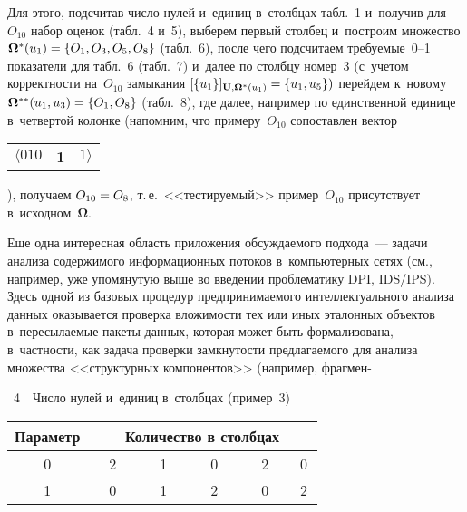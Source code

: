 \begin{multicols}{2}
Для этого, подсчитав число нулей и~единиц в~столбцах табл.~1 и~получив 
для~$O_{10}$ набор оценок (табл.~4 и~5), выберем первый столбец 
и~построим множество ${\boldsymbol{\Omega}}^*(u_1)\hm= \{O_1, O_3, O_5, O_8\}$ 
(табл.~6), после чего подсчитаем требуемые~0--1 показатели для табл.~6 
(табл.~7) и~далее по столбцу номер~3 (с~учетом корректности на~$O_{10}$ 
замыкания $[\{u_1\}]_{\mathbf{U},{\boldsymbol{\Omega}}^*(u_1)}\hm = \{u_1, u_5\})$ перейдем 
к~новому
${\boldsymbol{\Omega}}^{**}(u_1,u_3)\hm = \{O_1, O_8\}$ (табл.~8), где далее, 
например по единственной единице  в~четвертой колонке (напомним, что 
примеру~$O_{10}$ сопоставлен вектор
{\tabcolsep=0pt\begin{tabular}{ccc}
$\langle 010$&\cellcolor[gray]{.6}\textbf{1}&$1\rangle$\end{tabular}}), 
получаем $O_{10}\hm=O_8$, т.\,е.\ <<тестируемый>> пример~$O_{10}$ 
присутствует в~исходном~${\boldsymbol{\Omega}}$.




     
    Еще одна интересная область приложения об\-суж\-да\-емо\-го подхода~--- 
задачи анализа содержимого
  информационных потоков в~компьютерных 
сетях (см., например, уже упомянутую выше во введении проблематику DPI, 
IDS/IPS). Здесь одной из базовых процедур предпринимаемого 
интеллектуального анализа данных оказывается проверка вложимости тех 
или иных эталонных объектов в~пересылаемые пакеты данных, которая 
может быть формализована, в~частности, как задача проверки
 замкнутости 
предлагаемого для анализа множества
 <<структурных компонентов>> 
(например, фрагмен-\linebreak\vspace*{-12pt}

\columnbreak

\noindent
{\small
 \begin{center}  %
 \parbox{58mm}{{\tablename~4}\ \ \small{Число нулей и~единиц в~столбцах (пример~3)}}

\vspace*{2ex}

      \begin{tabular}{|c|c|c|c|c|c|}
\hline
Параметр& \multicolumn{5}{c|}{Количество в столбцах}\\
\hline
0&\ \ 2\ \ &\ \ 1\ \ &\ \ \cellcolor[gray]{.6}0\ \ &\ \  2\ \ &\,\cellcolor[gray]{.6}0\, \\
1&\ \ 0\ \ &\ \ 1\ \ &\ \ \cellcolor[gray]{.6}2\ \  &\ \ 0\ \ &\,\cellcolor[gray]{.6}2\, \\
\hline
\end{tabular}
\end{center}
}


\end{multicols}
